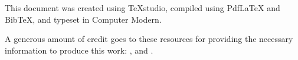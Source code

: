 
\thispagestyle{empty}
\small\sffamily
\begin{minipage}{5.5in}
This document was created using TeXstudio, compiled using PdfLaTeX and BibTeX, and typeset in Computer Modern. \vspace{3\parsep}

A generous amount of credit goes to these resources for providing the necessary information to produce this work: \citeauthor{Has,KnD}, and \citeauthor{Lam}.
\end{minipage}